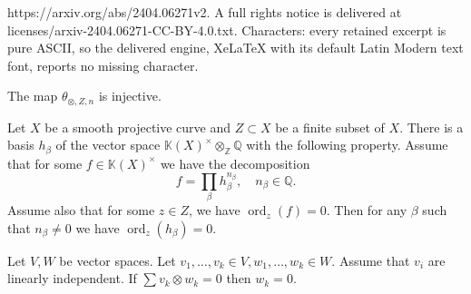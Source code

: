 \documentclass[10pt,a4paper]{amsart}
\DeclareMathOperator{\ord}{ord}
\def\Q{\mb Q}
\def\Z{\mb Z}
\def\k{\mb K}
\def\mb{\mathbb}
\begin{document}
https://arxiv.org/abs/2404.06271v2. A full rights notice is delivered at licenses/arxiv-2404.06271-CC-BY-4.0.txt. Characters: every retained excerpt is pure ASCII, so the delivered engine, XeLaTeX with its default Latin Modern text font, reports no missing character.
\begin{lemma}
\label{prop:theta_tensor_is_injective}
    The map $\theta_{\otimes,Z,n}$ is injective.
\end{lemma}

\begin{lemma}
\label{lemma:about_basis}
    Let $X$ be a smooth projective curve and $Z\subset X$ be a finite subset of $X$. There is a basis $h_\beta$ of the vector space $\k(X)^\times\otimes_\Z\Q$ with the following property.  Assume that for some $f\in \k(X)^\times$ we have the decomposition $$f=\prod_\beta  h_\beta^{n_\beta},\quad n_\beta\in \Q.$$
Assume also that for some $z\in Z$, we have $\ord_z(f)=0$. Then for any $\beta$ such that $n_\beta\ne 0$ we have $\ord_z(h_\beta)=0$.
\end{lemma}

\begin{lemma}
\label{lemma:linear_independence}
    Let $V,W$ be vector spaces. Let $v_1,\dots, v_k\in V, w_1,\dots, w_k\in W$. Assume that $v_i$ are linearly independent. If
    $\sum v_k\otimes w_k=0$ then $w_k=0$.
\end{lemma}
\end{document}
